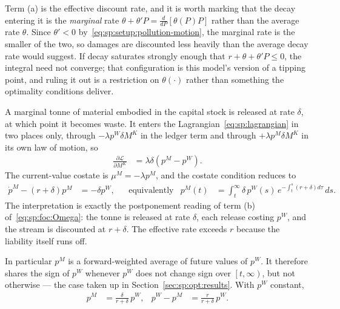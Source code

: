 Term (a) is the effective discount rate, and it is worth marking that the decay entering it is the \emph{marginal} rate $\theta+\theta'P=\tfrac{d}{dP}\left[\theta\left(P\right)P\right]$ rather than the average rate $\theta$. Since $\theta'<0$ by~\eqref{eq:sp:setup:pollution-motion}, the marginal rate is the smaller of the two, so damages are discounted less heavily than the average decay rate would suggest. If decay saturates strongly enough that $r+\theta+\theta'P\le0$, the integral need not converge; that configuration is this model's version of a tipping point, and ruling it out is a restriction on $\theta\left(\cdot\right)$ rather than something the optimality conditions deliver.

 A marginal tonne of material embodied in the capital stock is released at rate $\delta$, at which point it becomes waste. It enters the Lagrangian~\eqref{eq:sp:lagrangian} in two places only, through $-\lambda p^W\delta M^K$ in the ledger term and through $+\lambda p^M\delta M^K$ in its own law of motion, so
\begin{align*}
\frac{\partial\mathcal L}{\partial M^K} &= \lambda\delta\left(p^M-p^W\right).
\end{align*}
The current-value costate is $\mu^M=-\lambda p^M$, and the costate condition reduces to
\begin{align}
\dot p^M-\left(r+\delta\right)p^M &= -\delta p^W,
&&\text{equivalently}
&
p^M(t) &= \int_t^\infty \delta\,p^W(s)\,e^{-\int_t^s\left(r+\delta\right)d\tau}\,ds .
\label{eq:sp:costate:M}
\end{align}
The interpretation is exactly the postponement reading of term (b) of~\eqref{eq:sp:foc:Omega}: the tonne is released at rate $\delta$, each release costing $p^W$, and the stream is discounted at $r+\delta$. The effective rate exceeds $r$ because the liability itself runs off.

In particular $p^M$ is a forward-weighted average of future values of $p^W$. It therefore shares the sign of $p^W$ whenever $p^W$ does not change sign over $\left[t,\infty\right)$, but not otherwise --- the case taken up in Section~\ref{sec:sp:opt:results}. With $p^W$ constant,
\begin{align}
p^M &= \frac{\delta}{r+\delta}\,p^W,
&
p^W-p^M &= \frac{r}{r+\delta}\,p^W .
\label{eq:sp:costate:M-steady}
\end{align}

